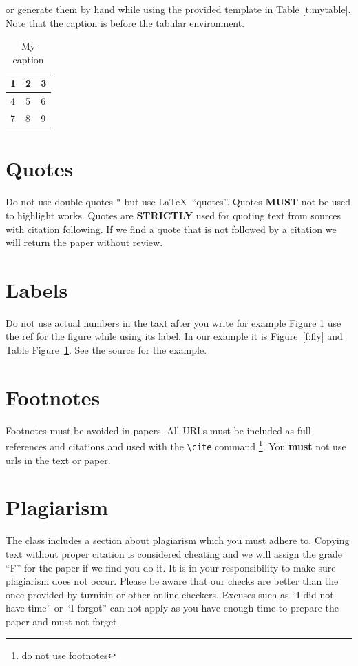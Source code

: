 or generate them by hand while using the provided template in Table
\ref{t:mytable}. Note that
the caption is before the tabular environment.

\begin{table}[htb]
\centering
\caption{My caption}
\label{t:mytabble}
\begin{tabular}{lll}
1 & 2 & 3 \\
\toprule
4 & 5 & 6 \\
7 & 8 & 9
\end{tabular}
\end{table}

\section{Quotes}

Do not use double quotes \verb|"| but use \LaTeX\ ``quotes''. Quotes
{\bf MUST} not be used to highlight works. Quotes are {\bf STRICTLY}
used for quoting text from sources with citation following. If we find
a quote that is not followed by a citation we will return the paper
without review.

\section{Labels}

Do not use actual numbers in the taxt after you write for example
Figure 1 use the ref for the figure while using its label. In our
example it is Figure~\ref{f:fly} and Table Figure~\ref{t:mytabble}.
See the source for the example.

\section{Footnotes}

Footnotes must be avoided in papers. All URLs must be included as full
references and citations and used with the \verb|\cite| command
\footnote{do not use footnotes}. You {\bf must} not use urls in the
text or paper.

\section{Plagiarism}

The class includes a section about plagiarism which you must adhere
to. Copying text without proper citation is considered cheating and we
will assign the grade ``F'' for the paper if we find you do it. It is
in your responsibility to make sure plagiarism does not occur. Please
be aware that our checks are better than the once provided by turnitin
or other online checkers. Excuses such as ``I did not have time'' or
``I forgot'' can not apply as you have enough time to prepare the
paper and must not forget. 

